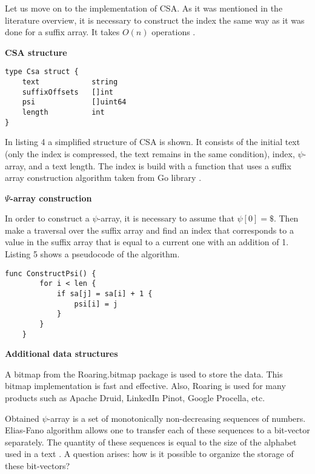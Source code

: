 
Let us move on to the implementation of CSA. As it was mentioned in the literature overview,
it is necessary to construct the index the same way as it was done for a suffix array.
It takes $O(n)$ operations \cite{huo2014practical}.

\textbf{CSA structure}

\begin{lstlisting}[caption=CSA structure]
type Csa struct {
	text            string
	suffixOffsets   []int
	psi             []uint64
	length          int
}
\end{lstlisting}

In listing 4 a simplified structure of CSA is shown. It consists of the initial text
(only the index is compressed, the text remains in the same condition), index, $\psi$-array, and a text length.
The index is build with a function that uses a suffix array construction algorithm taken from Go library
\cite{golang2016sa}.

\textbf{$\Psi$-array construction}

In order to construct a $\psi$-array, it is necessary to assume that $\psi[0] = \$$. Then make
a traversal over the suffix array and find an index that corresponds to a value in the suffix array that is
equal to a current one with an addition of 1. Listing 5 shows a pseudocode of the algorithm.

\begin{lstlisting}[caption=CSA construction]
	func ConstructPsi() {
		for i < len {
			if sa[j] = sa[i] + 1 {
				psi[i] = j
			}
		}
	}
\end{lstlisting}

\textbf{Additional data structures}

A bitmap from the Roaring.bitmap package \cite{chambi2016better} is used to store the data.
This bitmap implementation is fast and effective. Also, Roaring is used for many products such as
Apache Druid, LinkedIn Pinot, Google Procella, etc.

Obtained $\psi$-array is a set of monotonically non-decreasing sequences of numbers.
Elias-Fano algorithm allows one to transfer each of these sequences to a bit-vector separately.
The quantity of these sequences is equal to the size of the alphabet used in a text \cite{andersensimple}.
A question arises: how is it possible to organize the storage of these bit-vectors?

